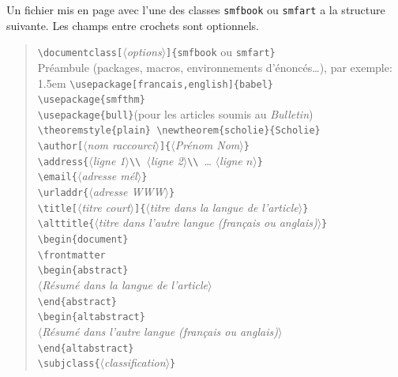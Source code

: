 \documentclass[11pt,francais]{smfart}
\def\meta#1{$\langle${\it #1}$\rangle$}
\begin{document}
Un fichier mis en page avec l'une des classes \texttt{smfbook}
ou \texttt{smfart} a la structure suivante.
Les champs entre crochets sont optionnels.

\begin{verse}
\verb|\documentclass[|\meta{options}\verb|]{smfbook| ou \verb|smfart}|\\
Pr\'eambule (packages, macros, environnements d'\'enonc\'es\dots), par
exemple: \\
{\advance\leftskip 1.5em
\verb|\usepackage[francais,english]{babel}| \\
\verb|\usepackage{smfthm}|\\
\verb|\usepackage{bull}|\quad (pour les articles soumis au \textsl{Bulletin})\\
\verb|\theoremstyle{plain} \newtheorem{scholie}{Scholie}|\\
}
\smallskip
\verb|\author[|\meta{nom raccourci}\verb|]{|\meta{Pr\'enom Nom}\verb|}| \\
\verb|\address{|\meta{ligne 1}\verb|\\ |\meta{ligne 2}\verb|\\ |\dots
\meta{ligne $n$}\verb|}| \\
\verb|\email{|\meta{adresse m\'el}\verb|}| \\
\verb|\urladdr{|\meta{adresse WWW}\verb|}|\\
\smallskip
\verb|\title[|\meta{titre court}\verb|]{|\meta{titre dans la langue de
    l'article}\verb|}| \\
\verb|\alttitle{|\meta{titre dans l'autre langue
    (fran\c{c}ais ou anglais)}\verb|}| \\
\bigskip
\verb|\begin{document}|\\
\verb|\frontmatter|\\
\smallskip
\verb|\begin{abstract}|\\
\quad\meta{R\'esum\'e dans la langue de l'article}\\
\verb|\end{abstract}|\\
\smallskip
\verb|\begin{altabstract}|\\
\quad\meta{R\'esum\'e dans l'autre langue (fran\c{c}ais ou anglais)}\\
\verb|\end{altabstract}| \\
\smallskip
\verb|\subjclass{|\meta{classification}\verb|}| \\

\end{verse}
\end{document}
